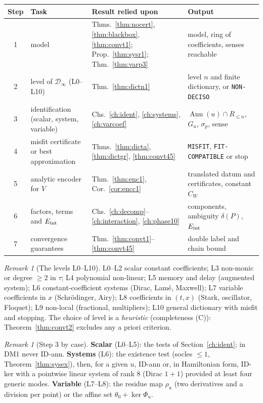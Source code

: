 \documentclass[11pt]{article}
\theoremstyle{plain}
\theoremstyle{definition}
\theoremstyle{remark}
\newtheorem{remark}[theorem]{Remark}
\DeclareMathOperator{\Ann}{Ann}             %
\newenvironment{aside}[1]{\begin{remark}[#1]}{\end{remark}}
\begin{document}
\begin{center}\small
\begin{tabular}{@{}c L{2.6cm} L{5.4cm} L{5.0cm}@{}}
\toprule
Step & Task & Result relied upon & Output\\ & model & Thms.~\ref{thm:nocert}, \ref{thm:blackbox}, \ref{thm:convt1}; Prop.~\ref{thm:sysr1}; Thm.~\ref{thm:varp3} & model, ring of coefficients, senses reachable\\
2 & level of $\mathcal D_\infty$ (L0--L10) & Thm.~\ref{thm:dictn1} & level $n$ and finite dictionary, or \texttt{NON-DECISO}\\
3 & identification (scalar, system, variable) & Chs.~\ref{ch:ident}, \ref{ch:systems}, \ref{ch:varcoef} & $\Ann(u)\cap R_{\le n}$, $G_u$, $\sigma_p$, sense\\
4 & misfit certificate or best approximation & Thms.~\ref{thm:dicta}, \ref{thm:dictgr}, \ref{thm:convt45} & \texttt{MISFIT}, \texttt{FIT-COMPATIBLE} or stop\\
5 & analytic encoder for $V$ & Thm.~\ref{thm:enc1}, Cor.~\ref{cor:encc1} & translated datum and certificates, constant $C_W$\\
6 & factors, terms and $E_{\rm int}$ & Chs.~\ref{ch:decomp}--\ref{ch:interaction}, \ref{ch:phase10} & components, ambiguity $\delta(P)$, $E_{\rm int}$\\
7 & convergence guarantees & Thm.~\ref{thm:convt1}--\ref{thm:convt45} & double label and chain bound\\\bottomrule
\end{tabular}
\end{center}

\begin{aside}{The levels L0--L10}
L0--L2 scalar constant coefficients; L3 non-monic or degree $\ge2$ in $\tau$; L4 polynomial non-linear; L5 memory and delay (augmented system); L6 constant-coefficient systems (Dirac, Lam\'e, Maxwell); L7 variable coefficients in $x$ (Schr\"odinger, Airy); L8 coefficients in $(t,x)$ (Stark, oscillator, Floquet); L9 non-local (fractional, multipliers); L10 general dictionary with misfit and stopping. The choice of level is a \emph{heuristic} (completeness (C)): Theorem~\ref{thm:convt2} excludes any a priori criterion.
\end{aside}

\begin{aside}{Step 3 by case}
\textbf{Scalar} (L0--L5): the tests of Section~\ref{ch:ident}; in DM1 never ID-ann. \textbf{Systems} (L6): the existence test (socles $\le1$, Theorem~\ref{thm:sysex}), then, for a given $u$, ID-ann or, in Hamiltonian form, ID-ker with a pointwise linear system of rank $8$ (Dirac $1+1$) provided at least four generic modes. \textbf{Variable} (L7--L8): the residue map $\rho_u$ (two derivatives and a division per point) or the affine set $\theta_0+\ker\Phi_u$.
\end{aside}
\end{document}
